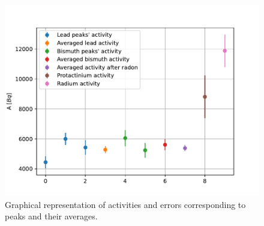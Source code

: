 \documentclass[pdftex,12pt,a4paper]{article}
\begin{document}
		\begin{figure}[H]
			\centering
			\includegraphics[scale=1]{./figs/graniteactivities.pdf}
			\caption{Graphical representation of activities and errors corresponding to peaks and their averages.}
			\label{graniteaveragesfig}
		\end{figure}
		
		
\end{document}

